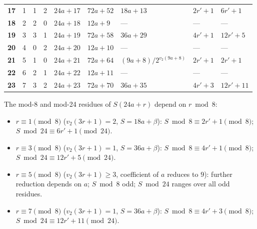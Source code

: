 \documentclass[11pt,a4paper]{article}
\theoremstyle{remark}
\theoremstyle{plain}
\begin{document}
\begin{tabular}{>{\bfseries}r|r|r|r|l|l|l|l|l}
\cellcolor{res17} 17 & \cellcolor{res1}1 & \cellcolor{res1}1 & \cellcolor{res2}2 & \cellcolor{res17}$24a + 17$ & \cellcolor{res17}$72a + 52$  & \cellcolor{res17}$18a + 13$                    & \cellcolor{res17}$2r'+1$          & \cellcolor{res17}$6r'+1$ \\
\cellcolor{res18} 18 & \cellcolor{res2}2 & \cellcolor{res2}2 & \cellcolor{res0}0 & \cellcolor{res18}$24a + 18$ & \cellcolor{res18}$12a + 9$   & \cellcolor{res18}---                            & \cellcolor{res18}---          & \cellcolor{res18}--- \\
\cellcolor{res19} 19 & \cellcolor{res3}3 & \cellcolor{res3}3 & \cellcolor{res1}1 & \cellcolor{res19}$24a + 19$ & \cellcolor{res19}$72a + 58$  & \cellcolor{res19}$36a + 29$                    & \cellcolor{res19}$4r'+1$    & \cellcolor{res19}$12r'+5$ \\
\cellcolor{res20} 20 & \cellcolor{res4}4 & \cellcolor{res0}0 & \cellcolor{res2}2 & \cellcolor{res20}$24a + 20$ & \cellcolor{res20}$12a + 10$  & \cellcolor{res20}---                            & \cellcolor{res20}---          & \cellcolor{res20}--- \\
\cellcolor{res21} 21 & \cellcolor{res5}5 & \cellcolor{res1}1 & \cellcolor{res0}0 & \cellcolor{res21}$24a + 21$ & \cellcolor{res21}$72a + 64$  & \cellcolor{res21}$(9a + 8)/2^{v_2(9a+8)}$      & \cellcolor{res21}$2r'+1$          & \cellcolor{res21}$2r'+1$ \\
\cellcolor{res22} 22 & \cellcolor{res6}6 & \cellcolor{res2}2 & \cellcolor{res1}1 & \cellcolor{res22}$24a + 22$ & \cellcolor{res22}$12a + 11$  & \cellcolor{res22}---                            & \cellcolor{res22}---          & \cellcolor{res22}--- \\
\cellcolor{res23} 23 & \cellcolor{res7}7 & \cellcolor{res3}3 & \cellcolor{res2}2 & \cellcolor{res23}$24a + 23$ & \cellcolor{res23}$72a + 70$  & \cellcolor{res23}$36a + 35$                    & \cellcolor{res23}$4r'+3$    & \cellcolor{res23}$12r'+11$ \\
\bottomrule
\end{tabular}
\normalsize

The mod-8 and mod-24 residues of $S(24a+r)$ depend on $r \bmod 8$:
\begin{itemize}
  \item $r \equiv 1 \pmod{8}$ ($v_2(3r+1)=2$, $S = 18a+\beta$):
        $S \bmod 8 \equiv 2r'+1 \pmod{8}$; $S \bmod 24 \equiv 6r'+1 \pmod{24}$.
  \item $r \equiv 3 \pmod{8}$ ($v_2(3r+1)=1$, $S = 36a+\beta$):
        $S \bmod 8 \equiv 4r'+1 \pmod{8}$; $S \bmod 24 \equiv 12r'+5 \pmod{24}$.
  \item $r \equiv 5 \pmod{8}$ ($v_2(3r+1)\ge 3$, coefficient of $a$ reduces to $9$):
        further reduction depends on $a$; $S \bmod 8$ odd;
        $S \bmod 24$ ranges over all odd residues.
  \item $r \equiv 7 \pmod{8}$ ($v_2(3r+1)=1$, $S = 36a+\beta$):
        $S \bmod 8 \equiv 4r'+3 \pmod{8}$; $S \bmod 24 \equiv 12r'+11 \pmod{24}$.
\end{itemize}
\end{document}
